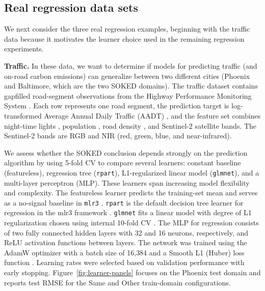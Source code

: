 \documentclass[twoside]{article}
\begin{document}
\subsection{Real regression data sets}
We next consider the three real regression examples, beginning with the traffic data because it motivates the learner choice used in the remaining regression experiments.

\textbf{Traffic.}
In these data, we want to determine if models for predicting traffic (and on-road carbon emissions) can generalize between two different cities (Phoenix and Baltimore, which are the two SOKED domains).
The traffic dataset contains gapfilled \citep{Gurney2025Vulcan} road-segment observations from the Highway Performance Monitoring System \citep{FHWA2016HPMSShapefile}.
Each row represents one road segment, the prediction target is log-transformed Average Annual Daily Traffic (AADT) \citep{bilal_hpms_aadt}, and the feature set combines night-time lights \citep{bilal_ntl_viirs}, population \citep{bilal_worldpop}, road density \citep{bilal_osm_roads}, and Sentinel-2 \citep{bilal_sentinel2} satellite bands.
The Sentinel-2 bands are RGB and NIR (red, green, blue, and near-infrared).

We assess whether the SOKED conclusion depends strongly on the prediction algorithm by using 5-fold CV to compare several learners: constant baseline (featureless), regression tree (\texttt{rpart}), L1-regularized linear model (\texttt{glmnet}), and a multi-layer perceptron (MLP).
These learners span increasing model flexibility and complexity.
The featureless learner predicts the training-set mean and serves as a no-signal baseline in \texttt{mlr3} \citep{Bischl2024}.
\texttt{rpart} is the default decision tree learner for regression in the mlr3 framework \citep{Breiman1984}.
\texttt{glmnet} fits a linear model with degree of L1 regularization chosen using internal 10-fold CV \citep{Friedman2010glmnet}.
The MLP for regression consists of two fully connected hidden layers with 32 and 16 neurons, respectively, and ReLU activation functions between layers.
The network was trained using the AdamW optimizer with a batch size of 16{,}384 and a Smooth L1 (Huber) loss function \citep{rtorch}.
Learning rates were selected based on validation performance with early stopping.
Figure~\ref{fig:learner-panels} focuses on the Phoenix test domain and reports test RMSE for the Same and Other train-domain configurations.
\end{document}
